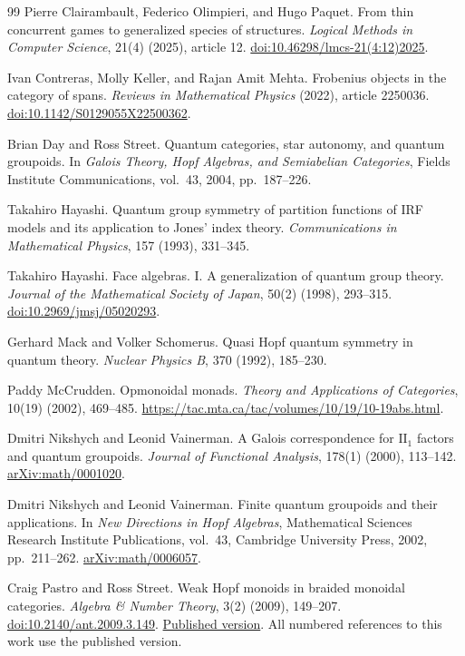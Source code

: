 \documentclass[oneside]{article}
\theoremstyle{plain}
\theoremstyle{definition}
\theoremstyle{remark}
\begin{document}
\begin{thebibliography}{99}
Pierre Clairambault, Federico Olimpieri, and Hugo Paquet.
From thin concurrent games to generalized species of structures.
\emph{Logical Methods in Computer Science}, 21(4) (2025), article 12.
\href{https://doi.org/10.46298/lmcs-21(4:12)2025}{doi:10.46298/lmcs-21(4:12)2025}.

Ivan Contreras, Molly Keller, and Rajan Amit Mehta.
Frobenius objects in the category of spans.
\emph{Reviews in Mathematical Physics} (2022), article 2250036.
\href{https://doi.org/10.1142/S0129055X22500362}{doi:10.1142/S0129055X22500362}.

Brian Day and Ross Street.
Quantum categories, star autonomy, and quantum groupoids.
In \emph{Galois Theory, Hopf Algebras, and Semiabelian Categories},
Fields Institute Communications, vol.~43, 2004, pp.~187--226.

Takahiro Hayashi.
Quantum group symmetry of partition functions of IRF models and its
application to Jones' index theory.
\emph{Communications in Mathematical Physics}, 157 (1993), 331--345.

Takahiro Hayashi.
Face algebras. I. A generalization of quantum group theory.
\emph{Journal of the Mathematical Society of Japan}, 50(2) (1998), 293--315.
\href{https://doi.org/10.2969/jmsj/05020293}{doi:10.2969/jmsj/05020293}.

Gerhard Mack and Volker Schomerus.
Quasi Hopf quantum symmetry in quantum theory.
\emph{Nuclear Physics B}, 370 (1992), 185--230.

Paddy McCrudden.
Opmonoidal monads.
\emph{Theory and Applications of Categories}, 10(19) (2002), 469--485.
\url{https://tac.mta.ca/tac/volumes/10/19/10-19abs.html}.

Dmitri Nikshych and Leonid Vainerman.
A Galois correspondence for \(\mathrm{II}_1\) factors and quantum groupoids.
\emph{Journal of Functional Analysis}, 178(1) (2000), 113--142.
\href{https://arxiv.org/abs/math/0001020}{arXiv:math/0001020}.

Dmitri Nikshych and Leonid Vainerman.
Finite quantum groupoids and their applications.
In \emph{New Directions in Hopf Algebras},
Mathematical Sciences Research Institute Publications, vol.~43,
Cambridge University Press, 2002, pp.~211--262.
\href{https://arxiv.org/abs/math/0006057}{arXiv:math/0006057}.

Craig Pastro and Ross Street.
Weak Hopf monoids in braided monoidal categories.
\emph{Algebra \& Number Theory}, 3(2) (2009), 149--207.
\href{https://doi.org/10.2140/ant.2009.3.149}{doi:10.2140/ant.2009.3.149}.
\href{https://msp.org/ant/2009/3-2/ant-v3-n2-p02-p.pdf}{Published version}.
All numbered references to this work use the published version.

\end{thebibliography}
\end{document}
